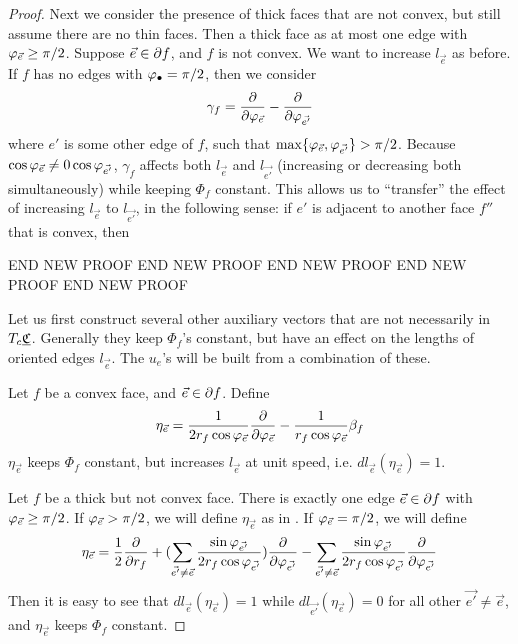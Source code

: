 \begin{proof}
Next we consider the presence of thick faces that are not convex,
but still assume there are no thin faces.
Then a thick face as at most one edge with $\varphi_{\vec{e}} \geq \pi/2$.
Suppose $\vec{e} \in \partial f$, and $f$ is not convex.
We want to increase $l_{\vec{e}}$ as before.
If $f$ has no edges with $\varphi_\bullet = \pi/2$,
then we consider
\begin{equation}
\gamma_f = {\frac{\partial}{\partial \varphi_{\vec{e}}}} - {\frac{\partial}{\partial \varphi_{\vec{e'}}}}
\end{equation}
where $e'$ is some other edge of $f$, such that
$\max \{\varphi_{\vec{e}}, \varphi_{\vec{e'}}\} > \pi/2$.
Because $\cos \varphi_{\vec{e}} \neq 0 \cos \varphi_{\vec{e'}}$,
$\gamma_f$ affects both $l_{\vec{e}}$ and $l_{\vec{e'}}$
(increasing or decreasing both simultaneously)
while keeping $\Phi_f$ constant.
This allows us to ``transfer'' the effect of increasing $l_{\vec{e}}$
to $l_{\vec{e'}}$, in the following sense:
if $e'$ is adjacent to another face $f''$ that is convex,
then 


END NEW PROOF END NEW PROOF END NEW PROOF END NEW PROOF END NEW PROOF 

Let us first construct several other auxiliary vectors
that are not necessarily in $T_c {\underline{\mathfrak{C}}}$.
Generally they keep $\Phi_f$'s constant,
but have an effect on the lengths of oriented edges $l_{\vec{e}}$.
The $u_e$'s will be built from a combination of these.


Let $f$ be a convex face, and $\vec{e} \in \partial f$. Define
\begin{equation}
\label{e:eta_e}
\eta_{\vec{e}} =
\frac{1}{2 r_f \cos \varphi_{\vec{e}}} {\frac{\partial}{\partial \varphi_{\vec{e}}}}
- \frac{1}{r_f \cos \varphi_{\vec{e}}} \beta_f
\end{equation}
$\eta_{\vec{e}}$ keeps $\Phi_f$ constant, but increases $l_{\vec{e}}$
at unit speed, i.e. $dl_{\vec{e}}(\eta_{\vec{e}}) = 1$.


Let $f$ be a thick but not convex face.
There is exactly one edge $\vec{e} \in \partial f$
with $\varphi_{\vec{e}} \geq \pi/2$.
If $\varphi_{\vec{e}} > \pi/2$, we will define
$\eta_{\vec{e}}$ as in .
If $\varphi_{\vec{e}} = \pi/2$,
we will define
\begin{equation}
\label{e:eta_e_2}
\eta_{\vec{e}} = \frac{1}{2}{\frac{\partial}{\partial r_f}}
+ (\sum_{\vec{e'} \neq \vec{e}}
	\frac{\sin \varphi_{\vec{e'}}}{2 r_f \cos \varphi_{\vec{e'}}})
	{\frac{\partial}{\partial \varphi_{\vec{e'}}}}
- \sum_{\vec{e'} \neq \vec{e}}
	\frac{\sin \varphi_{\vec{e'}}}{2 r_f \cos \varphi_{\vec{e'}}}
	{\frac{\partial}{\partial \varphi_{\vec{e'}}}}
\end{equation}
Then it is easy to see that
$dl_{\vec{e}}(\eta_{\vec{e}}) = 1$
while
$dl_{\vec{e'}}(\eta_{\vec{e}}) = 0$
for all other $\vec{e'} \neq \vec{e}$,
and $\eta_{\vec{e}}$ keeps $\Phi_f$ constant.



\end{proof}
